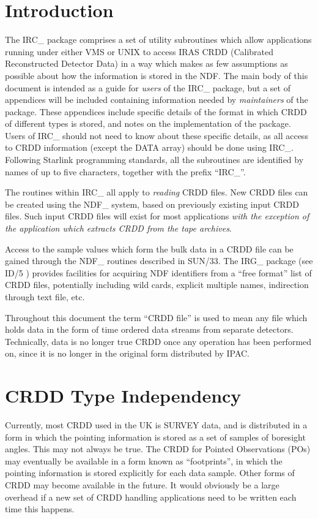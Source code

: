 \section {Introduction}
The IRC\_ package comprises a set of utility subroutines which allow
applications running under either VMS or UNIX to access IRAS CRDD (Calibrated
Reconstructed Detector Data) in a way which makes as few assumptions as possible
about how the information is stored in the NDF. The main body of this document
is intended as a guide for {\em users } of the IRC\_ package, but a set of
appendices will be included containing information needed by {\em maintainers }
of the package. These appendices include specific details of the format in which
CRDD of different types is stored, and notes on the implementation of the
package. Users of IRC\_ should not need to know about these specific details, as
all access to CRDD information (except the DATA array) should be done
using IRC\_. Following Starlink programming standards, all the subroutines are
identified by names of up to five characters, together with the prefix
``IRC\_''.

The routines within IRC\_ all apply to {\em reading } CRDD files. New CRDD files
can be created using the NDF\_ system, based on previously existing input CRDD
files. Such input CRDD files will exist for most applications {\em with the
exception of the application which extracts CRDD from the tape archives}.

Access to the sample values which form the bulk data in a CRDD file can be
gained through the NDF\_ routines described in
SUN/33. The IRG\_ package (see ID/5 ) provides facilities for acquiring NDF
identifiers from a ``free format'' list of CRDD files, potentially including wild
cards, explicit multiple names, indirection through text file, etc.

Throughout this document the term ``CRDD file'' is used to mean any file which
holds data in the form of time ordered data streams from separate detectors.
Technically, data is no longer true CRDD once any operation has been performed
on, since it is no longer in the original form distributed by IPAC.

\section {CRDD Type Independency}
\label {SEC:INDEP}
Currently, most CRDD used in the UK is SURVEY data, and is distributed in a form
in which the pointing information is stored as a set of samples of boresight
angles. This may not always be true. The CRDD for Pointed Observations
(POs) may eventually be available in a form known as ``footprints'', in
which the pointing information is stored explicitly for each data sample. Other
forms of CRDD may become available in the future. It would obviously be a large
overhead if a new set of CRDD handling applications need to be written each
time this happens.


